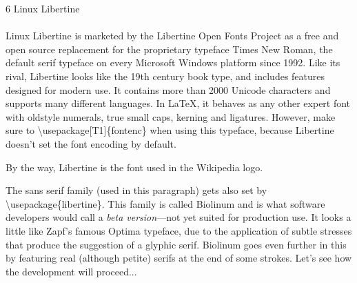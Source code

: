 \documentclass{article}
\begin{document}
\frenchspacing
\noindent
{\LARGE 6 Linux Libertine}\\
~\\
Linux Libertine is marketed by the Libertine Open Fonts Project as
a free and open source replacement for the proprietary typeface Times New
Roman, the default serif typeface on every Microsoft Windows platform since
1992. Like its rival, Libertine looks like the 19th century
book type, and includes features designed for modern use. It contains more
than 2000 Unicode characters and supports many different
languages. In \LaTeX, it behaves as any other expert font with oldstyle
numerals, true small caps, kerning and ligatures.
However, make sure to \textbackslash usepackage[T1]\{fontenc\} when using
this typeface, because Libertine doesn't set the font encoding by default.

By the way, Libertine is the font used in the Wikipedia
logo.

\sf
The sans serif family (used in this paragraph) gets also set by
\textbackslash usepackage\{libertine\}. This family is called Biolinum and is what software
developers would call a \emph{beta version}---not yet suited for production
use. It looks a little like Zapf's famous Optima typeface, due to the
application of subtle stresses that produce the suggestion of a glyphic
serif. Bio\-linum goes even further in this by featuring real (although
petite) serifs at the end of some strokes. Let's see how the development will
proceed...
\end{document}
